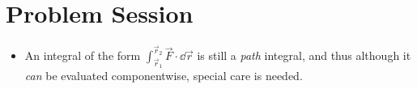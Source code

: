 \documentclass[../notes.tex]{subfiles}
\begin{document}
\section{Problem Session}
\begin{itemize}
    \item {}An integral of the form $\int_{\vec{r}_1}^{\vec{r}_2}\vec{F}\cdot\dd\vec{r}$ is still a \emph{path} integral, and thus although it \emph{can} be evaluated componentwise, special care is needed.
    \begin{figure}[h!]
        \centering
\end{figure}
\end{itemize}
\end{document}
